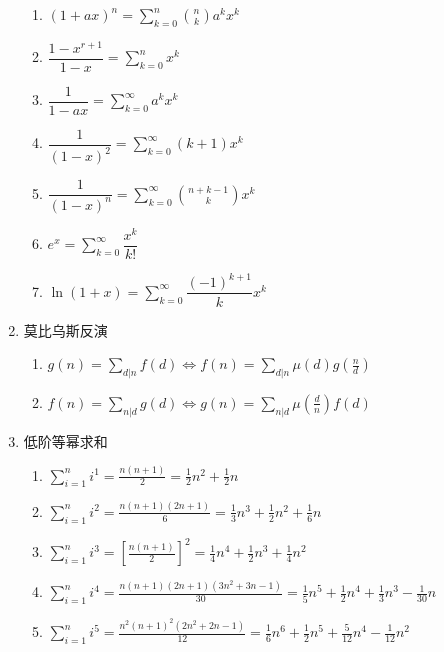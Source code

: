\begin{enumerate}
\begin{enumerate}
	\item $(1+ax)^n=\sum_{k=0}^n \binom {n}{k} a^kx^k$
	
	\item $\dfrac{1-x^{r+1}}{1-x}=\sum_{k=0}^nx^k$
	
	\item $\dfrac1{1-ax}=\sum_{k=0}^{\infty}a^kx^k$
	
	\item $\dfrac 1{(1-x)^2}=\sum_{k=0}^{\infty}(k+1)x^k$
	
	\item $\dfrac1{(1-x)^n}=\sum_{k=0}^{\infty} \binom{n+k-1}{k}x^k$
	
	\item $e^x=\sum_{k=0}^{\infty}\dfrac{x^k}{k!}$
	
	\item $\ln(1+x)=\sum_{k=0}^{\infty}\dfrac{(-1)^{k+1}}{k}x^k$

\end{enumerate}

\item 莫比乌斯反演

\begin{enumerate}
	
	\item $g(n) = \sum_{d|n} f(d) \Leftrightarrow f(n) = \sum_{d|n} \mu (d) g( \frac{n}{d})$
	
	\item $f(n)=\sum_{n|d}g(d) \Leftrightarrow g(n)=\sum_{n|d} \mu(\frac{d}{n}) f(d)$

\end{enumerate}

\item 低阶等幂求和

\begin{enumerate}
	
	\item $\sum_{i=1}^{n} i^{1} = \frac{n(n+1)}{2} = \frac{1}{2}n^2 +\frac{1}{2} n​$
	
	\item $\sum_{i=1}^{n} i^{2} = \frac{n(n+1)(2n+1)}{6} = \frac{1}{3}n^3 + \frac{1}{2}n^2 + \frac{1}{6}n$
	
	\item $\sum_{i=1}^{n} i^{3} = \left[\frac{n(n+1)}{2}\right]^{2} = \frac{1}{4}n^4 + \frac{1}{2}n^3 + \frac{1}{4}n^2$
	
	\item $\sum_{i=1}^{n} i^{4} = \frac{n(n+1)(2n+1)(3n^2+3n-1)}{30} = \frac{1}{5}n^5 + \frac{1}{2}n^4 + \frac{1}{3}n^3 - \frac{1}{30}n​$
	
	\item $\sum_{i=1}^{n} i^{5} = \frac{n^{2}(n+1)^{2}(2n^2+2n-1)}{12} = \frac{1}{6}n^6 + \frac{1}{2}n^5 + \frac{5}{12}n^4 - \frac{1}{12}n^2$
	
\end{enumerate}

\end{enumerate}